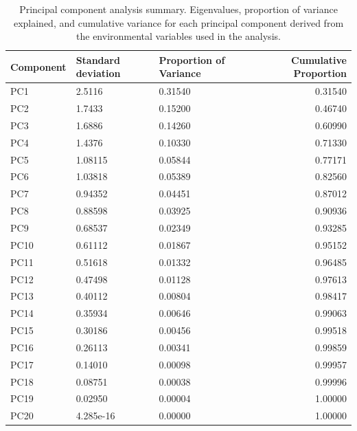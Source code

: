\documentclass[a4paper,fleqn]{cas-sc}
\begin{document}
\begin{table}[width=.9\linewidth,cols=4,pos=!htbp]
\caption{Principal component analysis summary. Eigenvalues, proportion of variance explained, and cumulative variance for each principal component derived from the environmental variables used in the analysis.}
\small
\begin{tabular*}{\tblwidth}{@{} LLL R @{}}
\toprule
\textbf{Component} & \textbf{Standard deviation} & \textbf{Proportion of Variance} & \textbf{Cumulative Proportion} \\
\midrule
PC1  & 2.5116 & 0.31540 & 0.31540 \\
PC2  & 1.7433 & 0.15200 & 0.46740 \\
PC3  & 1.6886 & 0.14260 & 0.60990 \\
PC4  & 1.4376 & 0.10330 & 0.71330 \\
PC5  & 1.08115 & 0.05844 & 0.77171 \\
PC6  & 1.03818 & 0.05389 & 0.82560 \\
PC7  & 0.94352 & 0.04451 & 0.87012 \\
PC8  & 0.88598 & 0.03925 & 0.90936 \\
PC9  & 0.68537 & 0.02349 & 0.93285 \\
PC10 & 0.61112 & 0.01867 & 0.95152 \\
PC11 & 0.51618 & 0.01332 & 0.96485 \\
PC12 & 0.47498 & 0.01128 & 0.97613 \\
PC13 & 0.40112 & 0.00804 & 0.98417 \\
PC14 & 0.35934 & 0.00646 & 0.99063 \\
PC15 & 0.30186 & 0.00456 & 0.99518 \\
PC16 & 0.26113 & 0.00341 & 0.99859 \\
PC17 & 0.14010 & 0.00098 & 0.99957 \\
PC18 & 0.08751 & 0.00038 & 0.99996 \\
PC19 & 0.02950 & 0.00004 & 1.00000 \\
PC20 & 4.285e-16 & 0.00000 & 1.00000 \\
\bottomrule
\end{tabular*}
\label{tab:6}
\end{table}
\end{document}
